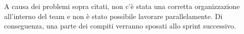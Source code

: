 A causa dei problemi sopra citati, non c'è stata una corretta organizzazione all'interno del team e non è stato possibile lavorare parallelamente. Di conseguenza, una parte dei compiti verranno sposati allo sprint successivo.